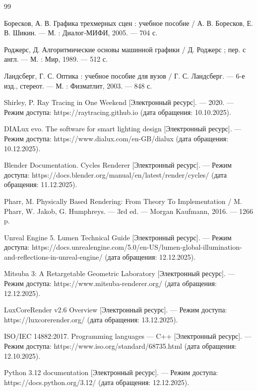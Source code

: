 \begin{thebibliography}{99}

    
    Боресков, А. В. Графика трехмерных сцен : учебное пособие / А. В. Боресков, Е. В. Шикин. — М. : Диалог-МИФИ, 2005. — 704 с.
    
    Роджерс, Д. Алгоритмические основы машинной графики / Д. Роджерс ; пер. с англ. — М. : Мир, 1989. — 512 с.
    
    Ландсберг, Г. С. Оптика : учебное пособие для вузов / Г. С. Ландсберг. — 6-е изд., стереот. — М. : Физматлит, 2003. — 848 с.
    
    Shirley, P. Ray Tracing in One Weekend [Электронный ресурс]. — 2020. — Режим доступа: https://raytracing.github.io (дата обращения: 10.10.2025).
    
    DIALux evo. The software for smart lighting design [Электронный ресурс]. — Режим доступа: https://www.dialux.com/en-GB/dialux (дата обращения: 10.12.2025).
    
    Blender Documentation. Cycles Renderer [Электронный ресурс]. — Режим доступа: https://docs.blender.org/manual/en/latest/render/cycles/ (дата обращения: 11.12.2025).
    
    Pharr, M. Physically Based Rendering: From Theory To Implementation / M. Pharr, W. Jakob, G. Humphreys. — 3rd ed. — Morgan Kaufmann, 2016. — 1266 p.
    
    Unreal Engine 5. Lumen Technical Guide [Электронный ресурс]. — Режим доступа: https://docs.unrealengine.com/5.0/en-US/lumen-global-illumination-and-reflections-in-unreal-engine/ (дата обращения: 12.12.2025).
    
    Mitsuba 3: A Retargetable Geometric Laboratory [Электронный ресурс]. — Режим доступа: https://www.mitsuba-renderer.org/ (дата обращения: 12.12.2025).
    
    LuxCoreRender v2.6 Overview [Электронный ресурс]. — Режим доступа: https://luxcorerender.org/ (дата обращения: 13.12.2025).
    
    ISO/IEC 14882:2017. Programming languages — C++ [Электронный ресурс]. — Режим доступа: https://www.iso.org/standard/68735.html (дата обращения: 12.10.2025).
    
    Python 3.12 documentation [Электронный ресурс]. — Режим доступа: https://docs.python.org/3.12/ (дата обращения: 12.12.2025).
    

\end{thebibliography}
